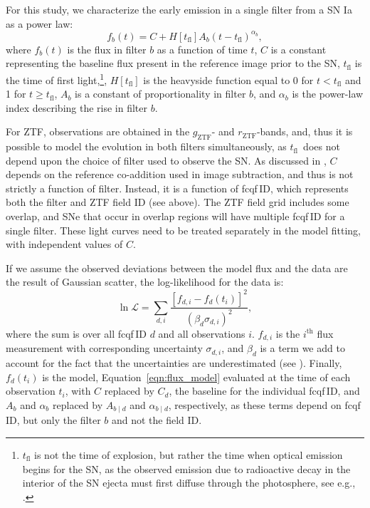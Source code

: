\documentclass[twocolumn]{./aastex63}
\newcommand{\rztf}{$r_\mathrm{ZTF}$}
\newcommand{\gztf}{$g_\mathrm{ZTF}$}
\newcommand{\tfl}{$t_\mathrm{fl}$}
\begin{document}
For this study, we characterize the early emission in a single filter from a
SN Ia as a power law:
%
\begin{equation}
    f_b(t) = C + H[t_\mathrm{fl}] A_b (t - t_\mathrm{fl})^{\alpha_b},
    \label{eqn:flux_model}
\end{equation}
%
where $f_b(t)$ is the flux in filter $b$ as a function of time $t$, $C$ is a
constant representing the baseline flux present in the reference image prior
to the SN, $t_\mathrm{fl}$ is the time of first light,\footnote{$t_\mathrm{fl}$ is not the time of
explosion, but rather the time when optical emission begins for the SN, as
the observed emission due to radioactive decay in the interior of the SN
ejecta must first diffuse through the photosphere, see e.g.,
\citet{Piro13,Piro14}.}, $H[t_\mathrm{fl}]$ is the heavyside function equal
to 0 for $t < t_\mathrm{fl}$ and 1 for $t \ge t_\mathrm{fl}$, $A_b$ is a
constant of proportionality in filter $b$, and $\alpha_b$ is the power-law
index describing the rise in filter $b$.

For ZTF, observations are obtained in the \gztf- and \rztf-bands, and, thus
it is possible to model the evolution in both filters simultaneously, as
\tfl\ does not depend upon the choice of filter used to observe the SN. As
discussed in \citet{Yao19}, $C$ depends on the reference co-addition used in
image subtraction, and thus is not strictly a function of filter. Instead,
it is a function of fcqf\,ID, which represents both the filter and ZTF field
ID (see above). The ZTF field grid includes some overlap, and SNe that occur
in overlap regions will have multiple fcqf\,ID for a single filter. These
light curves need to be treated separately in the model fitting, with
independent values of $C$.

If we assume the observed deviations between the model flux and the data are the result of Gaussian scatter, the log-likelihood for the data is:
%
\begin{equation}
    \ln \mathscr{L} = \sum_{d,i} \frac{[f_{d,i} - f_d(t_i)]^2}{(\beta_d \sigma_{d,i})^2},
\end{equation}
%
where the sum is over all fcqf\,ID $d$ and all observations $i$. $f_{d,i}$
is the $i^\mathrm{th}$ flux measurement with corresponding uncertainty
$\sigma_{d,i}$, and $\beta_d$ is a term we add to account for the fact that
the uncertainties are underestimated (see \citealt{Yao19}). Finally,
$f_d(t_i)$ is the model, Equation~\ref{eqn:flux_model} evaluated at the time
of each observation $t_i$, with $C$ replaced by $C_d$, the baseline for the
individual fcqf\,ID, and $A_b$ and $\alpha_b$ replaced by $A_{b\mid d}$ and
$\alpha_{b\mid d}$, respectively, as these terms depend on fcqf\,ID, but
only the filter $b$ and not the field ID.
\end{document}
